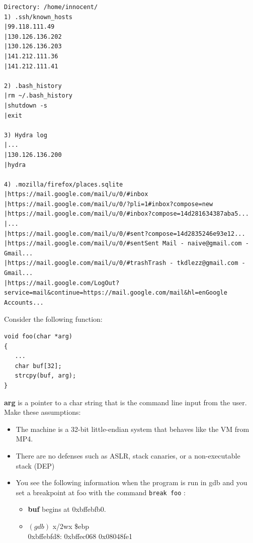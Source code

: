 \documentclass[addpoints,answers]{exam}
\begin{document}
\begin{questions}
\begin{lstlisting}
Directory: /home/innocent/
1) .ssh/known_hosts
|99.118.111.49
|130.126.136.202
|130.126.136.203
|141.212.111.36
|141.212.111.41

2) .bash_history
|rm ~/.bash_history
|shutdown -s
|exit

3) Hydra log
|...
|130.126.136.200
|hydra

4) .mozilla/firefox/places.sqlite
|https://mail.google.com/mail/u/0/#inbox
|https://mail.google.com/mail/u/0/?pli=1#inbox?compose=new
|https://mail.google.com/mail/u/0/#inbox?compose=14d281634387aba5...
|...
|https://mail.google.com/mail/u/0/#sent?compose=14d2835246e93e12...
|https://mail.google.com/mail/u/0/#sentSent Mail - naive@gmail.com - Gmail...
|https://mail.google.com/mail/u/0/#trashTrash - tkdlezz@gmail.com - Gmail...
|https://mail.google.com/LogOut?service=mail&continue=https://mail.google.com/mail&hl=enGoogle Accounts...

\end{lstlisting}

\pagebreak


Consider the following function:

\begin{lstlisting}
void foo(char *arg)
{
   ... 
   char buf[32];
   strcpy(buf, arg);
}
\end{lstlisting}

\textbf{arg} is a pointer to a char string that is the command line input from the user.  
Make these assumptions:
\begin{itemize}
\item The machine is a 32-bit little-endian system that behaves like the VM from MP4.
\item There are no defenses such as ASLR, stack canaries, or a non-executable stack (DEP)
\item You see the following information when the program is run in gdb and you set a breakpoint at foo with the command \texttt{break foo} :
\begin{itemize}
\item \textbf{buf} begins at 0xbffebfb0. 
\item $(gdb)$  x/2wx \$ebp\\
0xbffebfd8: 0xbffec068 0x08048fe1
\end{itemize}
\end{itemize}

\begin{parts}


\end{parts}
\end{questions}
\end{document}
